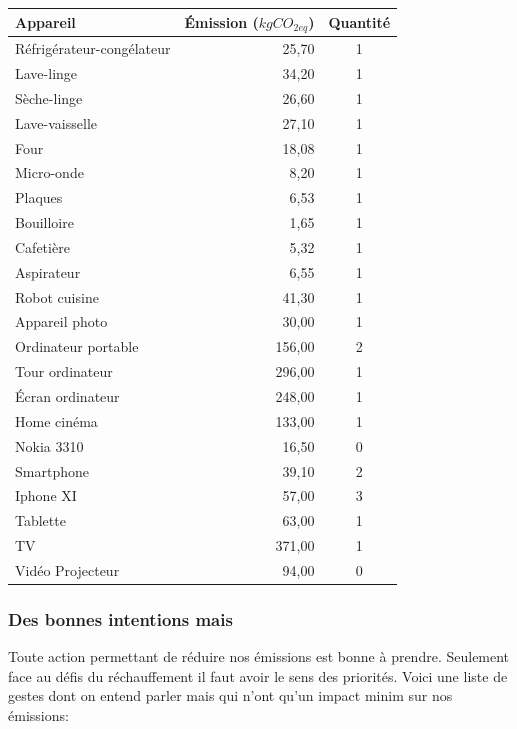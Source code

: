 \begin{longtable}[]{@{}lrc@{}}
\toprule
Appareil & Émission (\(kgCO_{2eq}\)) & Quantité \\
\midrule
\endhead
Réfrigérateur-congélateur & 25,70 & 1 \\
Lave-linge & 34,20 & 1 \\
Sèche-linge & 26,60 & 1 \\
Lave-vaisselle & 27,10 & 1 \\
Four & 18,08 & 1 \\
Micro-onde & 8,20 & 1 \\
Plaques & 6,53 & 1 \\
Bouilloire & 1,65 & 1 \\
Cafetière & 5,32 & 1 \\
Aspirateur & 6,55 & 1 \\
Robot cuisine & 41,30 & 1 \\
Appareil photo & 30,00 & 1 \\
Ordinateur portable & 156,00 & 2 \\
Tour ordinateur & 296,00 & 1 \\
Écran ordinateur & 248,00 & 1 \\
Home cinéma & 133,00 & 1 \\
Nokia 3310 & 16,50 & 0 \\
Smartphone & 39,10 & 2 \\
Iphone XI & 57,00 & 3 \\
Tablette & 63,00 & 1 \\
TV & 371,00 & 1 \\
Vidéo Projecteur & 94,00 & 0 \\
\bottomrule
\end{longtable}

\hypertarget{des-bonnes-intentions-mais}{%
\subsubsection{Des bonnes intentions
mais}\label{des-bonnes-intentions-mais}}

Toute action permettant de réduire nos émissions est bonne à prendre.
Seulement face au défis du réchauffement il faut avoir le sens des
priorités. Voici une liste de gestes dont on entend parler mais qui
n'ont qu'un impact minim sur nos émissions:

